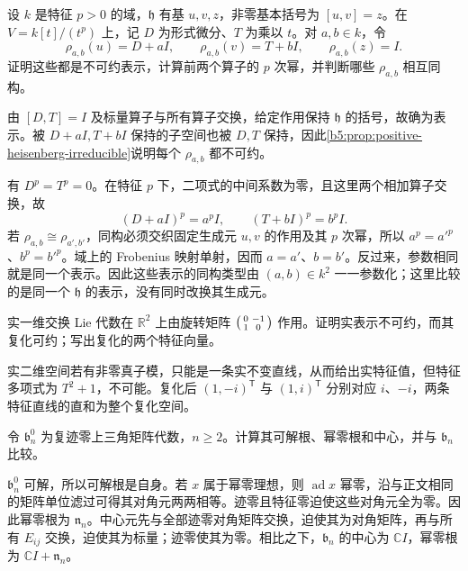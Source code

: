 \begin{exercise}\label{b5:ex:12-positive-heisenberg-simple}
	设 \(k\) 是特征 \(p>0\) 的域，\(\mathfrak h\) 有基 \(u,v,z\)，非零基本括号为 \([u,v]=z\)。在 \(V=k[t]/(t^p)\) 上，记 \(D\) 为形式微分、\(T\) 为乘以 \(t\)。对 \(a,b\in k\)，令
	\[
		\rho_{a,b}(u)=D+aI,\qquad \rho_{a,b}(v)=T+bI,\qquad \rho_{a,b}(z)=I.
	\]
	证明这些都是不可约表示，计算前两个算子的 \(p\) 次幂，并判断哪些 \(\rho_{a,b}\) 相互同构。
\end{exercise}
\begin{solution}
	由 \([D,T]=I\) 及标量算子与所有算子交换，给定作用保持 \(\mathfrak h\) 的括号，故确为表示。被 \(D+aI,T+bI\) 保持的子空间也被 \(D,T\) 保持，因此\cref{b5:prop:positive-heisenberg-irreducible}说明每个 \(\rho_{a,b}\) 都不可约。

	有 \(D^p=T^p=0\)。在特征 \(p\) 下，二项式的中间系数为零，且这里两个相加算子交换，故
	\[
		(D+aI)^p=a^pI,\qquad (T+bI)^p=b^pI.
	\]
	若 \(\rho_{a,b}\cong\rho_{a',b'}\)，同构必须交织固定生成元 \(u,v\) 的作用及其 \(p\) 次幂，所以 \(a^p=a'^p\)、\(b^p=b'^p\)。域上的 Frobenius 映射单射，因而 \(a=a'\)、\(b=b'\)。反过来，参数相同就是同一个表示。因此这些表示的同构类型由 \((a,b)\in k^2\) 一一参数化；这里比较的是同一个 \(\mathfrak h\) 的表示，没有同时改换其生成元。
\end{solution}

\begin{exercise}\label{b5:ex:12-real-rotation}
	实一维交换 Lie 代数在 \(\mathbb R^2\) 上由旋转矩阵
	\(\begin{psmallmatrix}0&-1\\1&0\end{psmallmatrix}\) 作用。证明实表示不可约，而其复化可约；写出复化的两个特征向量。
\end{exercise}
\begin{solution}
	实二维空间若有非零真子模，只能是一条实不变直线，从而给出实特征值，但特征多项式为 \(T^2+1\)，不可能。复化后 \((1,-i)^{\mathsf T}\) 与 \((1,i)^{\mathsf T}\) 分别对应 \(i\)、\(-i\)，两条特征直线的直和为整个复化空间。
\end{solution}

\begin{exercise}\label{b5:ex:12-traceless-triangular-radicals}
	令 \(\mathfrak b_n^0\) 为复迹零上三角矩阵代数，\(n\ge2\)。计算其可解根、幂零根和中心，并与 \(\mathfrak b_n\) 比较。
\end{exercise}
\begin{solution}
	\(\mathfrak b_n^0\) 可解，所以可解根是自身。若 \(x\) 属于幂零理想，则 \(\operatorname{ad}x\) 幂零，沿与正文相同的矩阵单位滤过可得其对角元两两相等。迹零且特征零迫使这些对角元全为零。因此幂零根为 \(\mathfrak n_n\)。中心元先与全部迹零对角矩阵交换，迫使其为对角矩阵，再与所有 \(E_{ij}\) 交换，迫使其为标量；迹零使其为零。相比之下，\(\mathfrak b_n\) 的中心为 \(\mathbb CI\)，幂零根为 \(\mathbb CI+\mathfrak n_n\)。
\end{solution}

